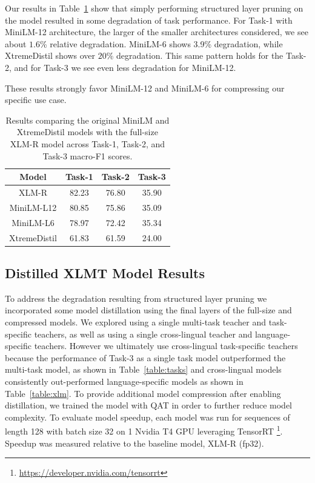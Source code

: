 Our results in Table~\ref{table:pruning} show that simply performing structured layer pruning on the model resulted in some degradation of task performance.  
For Task-1 with MiniLM-12 architecture, the larger of the smaller architectures considered, we see about $1.6$\% relative degradation. MiniLM-6 shows 3.9\% degradation, while XtremeDistil shows over $20$\% degradation.
This same pattern holds for the Task-2, and for Task-3 we see even less degradation for MiniLM-12.

These results strongly favor MiniLM-12 and MiniLM-6 for compressing our specific use case.

\begin{table}[h]
\centering
\begin{tabular}{cccc}
    \hline
    \textbf{Model} &  \textbf{Task-1} & \textbf{Task-2} & \textbf{Task-3} \\
    \hline
    XLM-R & 82.23 & 76.80 & 35.90 \\
    MiniLM-L12 & 80.85 & 75.86 & 35.09 \\  %
    MiniLM-L6 & 78.97 & 72.42 & 35.34 \\
    XtremeDistil & 61.83 & 61.59 & 24.00 \\
    \hline
\end{tabular}
\caption{Results comparing the original MiniLM and XtremeDistil models with the full-size XLM-R model across Task-1, Task-2, and Task-3 macro-F1 scores.}
\label{table:pruning}
\end{table}


\subsection{Distilled XLMT Model Results}
To address the degradation resulting from structured layer pruning we incorporated some model distillation using the final layers of the full-size and compressed models.
We explored using a single multi-task teacher and task-specific teachers, as well as using a single cross-lingual teacher and language-specific teachers.
However we ultimately use cross-lingual task-specific teachers because the performance of Task-3 as a single task model outperformed the multi-task model, as shown in Table~\ref{table:tasks} and cross-lingual models consistently out-performed language-specific models as shown in Table~\ref{table:xlm}.
To provide additional model compression after enabling distillation, we trained the model with QAT in order to further reduce model complexity.
To evaluate model speedup, each model was run for sequences of length 128 with batch size 32 on 1 Nvidia T4 GPU leveraging TensorRT \footnote{\url{https://developer.nvidia.com/tensorrt}}.
Speedup was measured relative to the baseline model, XLM-R (fp32). 


